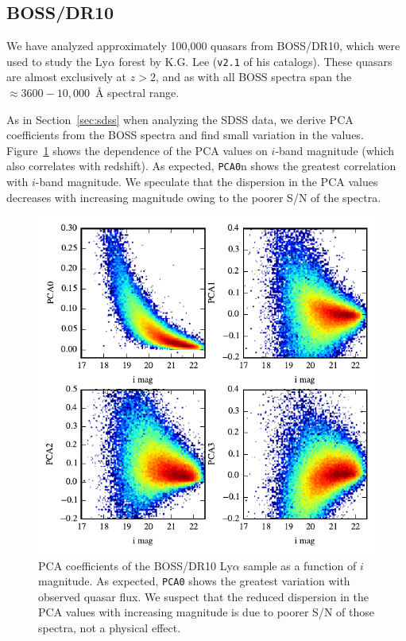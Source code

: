 \documentclass[11pt]{article}
\begin{document}
\subsection{BOSS/DR10}

We have analyzed approximately 100,000 quasars from BOSS/DR10, which
were used to study the Ly$\alpha$ forest by K.G. Lee ({\tt v2.1} of
his catalogs).  These quasars are almost exclusively at $z>2$, and as
with all BOSS spectra span the $\approx 3600-10,000$~\AA{} spectral
range. 

As in Section~\ref{sec:sdss} when analyzing the SDSS data, we derive
PCA coefficients from the BOSS spectra and find small variation in the
values.  Figure~\ref{fig:boss_pca_vs_i} shows the dependence of the
PCA values on $i$-band magnitude (which also correlates with
redshift).  As expected, {\tt PCA0}n shows the greatest correlation
with $i$-band magnitude.  We speculate that the dispersion in the PCA
values decreases with increasing magnitude owing to the poorer S/N of
the spectra.

\begin{figure}[h!]
  \vskip -0.1in
\begin{center}
  \includegraphics[width=5in]{figures/fig_boss_imag_vs_pca.pdf}
\end{center}
 \vskip -0.20in
  \caption{\footnotesize PCA coefficients of the BOSS/DR10 Ly$\alpha$
    sample as a function of $i$ magnitude.  As expected, {\tt PCA0}
    shows the greatest variation with observed quasar flux.  We
    suspect that the reduced dispersion in the PCA values with
    increasing magnitude is due to poorer S/N of those spectra, not a
    physical effect.  }\label{fig:boss_pca_vs_i}
\vskip -0.1in
\end{figure}
\end{document}
